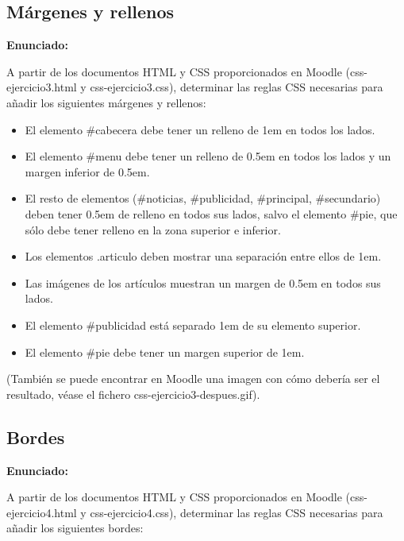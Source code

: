 \subsection{Márgenes y rellenos}
\label{subsec:margenes-rellenos}

\textbf{Enunciado:}

A partir de los documentos HTML y CSS proporcionados en Moodle (css-ejercicio3.html y css-ejercicio3.css), determinar las reglas CSS necesarias para añadir los siguientes márgenes y rellenos:

\begin{itemize}
  \item El elemento \#cabecera debe tener un relleno de 1em en todos los lados.
  \item El elemento \#menu debe tener un relleno de 0.5em en todos los lados y un margen inferior de 0.5em.
  \item El resto de elementos (\#noticias, \#publicidad, \#principal, \#secundario) deben tener 0.5em de relleno en todos sus lados, salvo el elemento \#pie, que sólo debe tener relleno en la zona superior e inferior.
  \item Los elementos .articulo deben mostrar una separación entre ellos de 1em.
  \item Las imágenes de los artículos muestran un margen de 0.5em en todos sus lados.
  \item El elemento \#publicidad está separado 1em de su elemento superior.
  \item El elemento \#pie debe tener un margen superior de 1em.
\end{itemize}

(También se puede encontrar en Moodle una imagen con cómo debería ser el resultado, 
véase el fichero css-ejercicio3-despues.gif).


\subsection{Bordes}
\label{subsec:bordes}

\textbf{Enunciado:}

A partir de los documentos HTML y CSS proporcionados en Moodle (css-ejercicio4.html y css-ejercicio4.css), determinar las reglas CSS necesarias para añadir los siguientes bordes:

